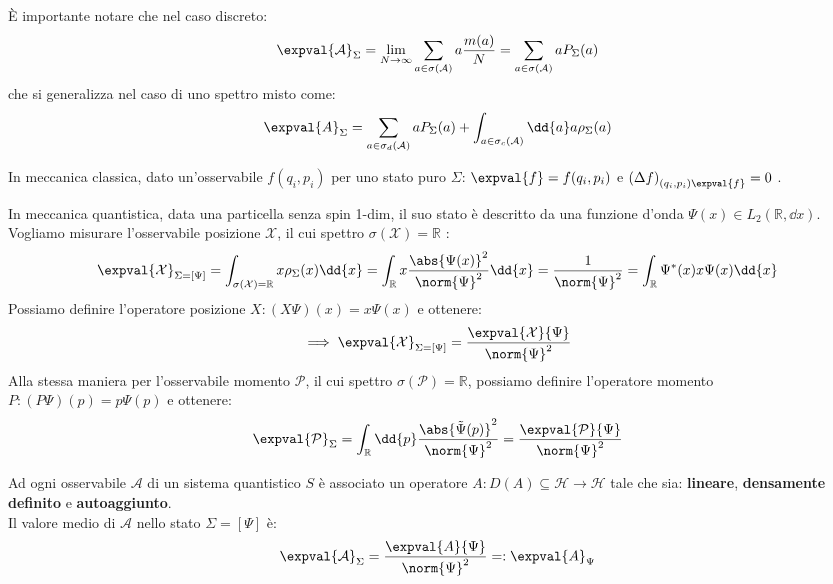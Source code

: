 È importante notare che nel caso discreto: 
\begin{equation}
    \expval{\mathcal{A}}_\Sigma = \lim_{N\to \infty} \sum_{a \in \sigma(\mathcal{A})} a \frac{m(a)}{N} = \sum_{a \in \sigma(\mathcal{A})} a P_\Sigma(a)
\end{equation}
che si generalizza nel caso di uno spettro misto come:
\begin{equation}
    \expval{A}_\Sigma = \sum_{a \in \sigma_d(\mathcal{A})} a P_\Sigma(a) + \int_{a \in \sigma_c(\mathcal{A}) } \dd{a} a \rho_\Sigma(a)
\end{equation}
\begin{example}
    In meccanica classica, dato un'osservabile \(f(q_i,p_i)\) per uno stato puro \(\Sigma\): 
    \(\expval{f}= f(q_i, p_i)\) e \(\left( \Delta f \right)_{(q_i,p_i) \expval{f}}=0\) .
\end{example}

\begin{example}
    In meccanica quantistica, data una particella senza spin 1-dim, il suo stato è descritto da una funzione d'onda \(\Psi(x) \in L_2(\mathbb{R}, \dd{x})\).
    Vogliamo misurare l'osservabile posizione \(\mathcal{X}\), il cui spettro \(\sigma(\mathcal{X}) = \mathbb{R}\) :
    \[
        \expval{\mathcal{X}}_{\Sigma= [\Psi]} = \int_{\sigma(\mathcal{X})= \mathbb{R}} x\rho_\Sigma(x) \dd{x} = \int_{\mathbb{R}} x \frac{\abs{\Psi(x)}^2}{\norm{\Psi}^2} \dd{x}= 
        \frac{1}{\norm{\Psi}^2}= \int_{\mathbb{R}} \Psi^*(x) x \Psi(x) \dd{x}
    \]
    Possiamo definire l'operatore posizione \(X: (X\Psi)(x)= x\Psi(x)\) e ottenere:
    \begin{equation}
        \implies \expval{\mathcal{X}}_{\Sigma= [\Psi]} = \frac{\expval{\mathcal{X}}{\Psi}}{\norm{\Psi}^2}
    \end{equation}
    Alla stessa maniera per l'osservabile momento \(\mathcal{P}\), il cui spettro \(\sigma(\mathcal{P})= \mathbb{R}\),
    possiamo definire l'operatore momento \(P: (P\Psi)(p)= p\Psi(p)\) e ottenere:
    \begin{equation}
        \expval{\mathcal{P}}_{\Sigma} = \int_{\mathbb{R}} \dd{p} \frac{\abs{\tilde{\Psi}(p)}^2}{\norm{\Psi}^2}= \frac{\expval{\mathcal{P}}{\Psi}}{\norm{\Psi}^2}
    \end{equation}

\end{example}

\begin{postulato2}
    Ad ogni osservabile \(\mathcal{A}\) di un sistema quantistico \(S\) è associato un operatore \(A: D(A) \subseteq \mathcal{H} \to \mathcal{H}\) tale che sia:
    \textbf{lineare}, \textbf{densamente definito} e \textbf{autoaggiunto}. \\
    Il valore medio di \(\mathcal{A}\) nello stato \(\Sigma = [\Psi]\) è:
    \begin{equation}
        \expval{\mathcal{A}}_\Sigma = \frac{\expval{A}{\Psi}}{\norm{\Psi}^2} =: \expval{A}_\Psi
    \end{equation}
\end{postulato2}


